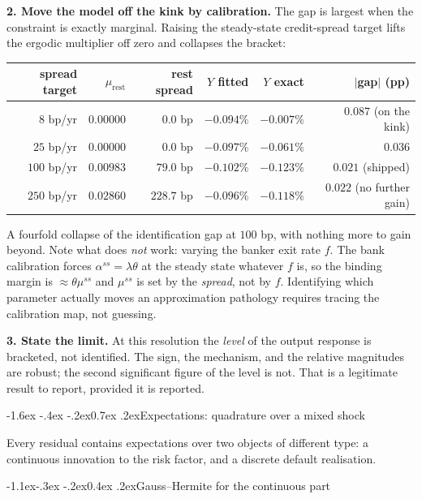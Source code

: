 \documentclass[10pt,a4paper]{article}
\makeatletter
\theoremstyle{definition}
\theoremstyle{plain}
\theoremstyle{remark}
\renewcommand\section{\@startsection{section}{1}{\z@}%
  {-1.6ex \@plus -.4ex \@minus -.2ex}{0.7ex \@plus.2ex}{\normalfont\large\bfseries}}
\renewcommand\subsection{\@startsection{subsection}{2}{\z@}%
  {-1.1ex\@plus -.3ex \@minus -.2ex}{0.4ex \@plus .2ex}{\normalfont\normalsize\bfseries}}
\makeatother
\begin{document}
\textbf{2. Move the model off the kink by calibration.} The gap is largest when the constraint
is exactly marginal. Raising the steady-state credit-spread target lifts the ergodic
multiplier off zero and collapses the bracket:
\begin{center}\small
\begin{tabular}{@{}rrrrrr@{}}
\toprule
spread target & $\mu_{\mathrm{rest}}$ & rest spread & $Y$ fitted & $Y$ exact & $|$gap$|$ (pp) \\
\midrule
$8$ bp/yr   & $0.00000$ & $0.0$ bp & $-0.094\%$ & $-0.007\%$ & $0.087$ \quad(on the kink)\\
$25$ bp/yr  & $0.00000$ & $0.0$ bp & $-0.097\%$ & $-0.061\%$ & $0.036$ \\
$100$ bp/yr & $0.00983$ & $79.0$ bp & $-0.102\%$ & $-0.123\%$ & $\mathbf{0.021}$ \quad(shipped)\\
$250$ bp/yr & $0.02860$ & $228.7$ bp & $-0.096\%$ & $-0.118\%$ & $0.022$ \quad(no further gain)\\
\bottomrule
\end{tabular}
\end{center}
A fourfold collapse of the identification gap at $100$ bp, with nothing more to gain beyond.
Note what does \emph{not} work: varying the banker exit rate $f$. The bank calibration forces
$\alpha^{ss} = \lambda\theta$ at the steady state whatever $f$ is, so the binding margin is
$\approx\theta\mu^{ss}$ and $\mu^{ss}$ is set by the \emph{spread}, not by $f$. Identifying
which parameter actually moves an approximation pathology requires tracing the calibration
map, not guessing.

\textbf{3. State the limit.} At this resolution the \emph{level} of the output response is
bracketed, not identified. The sign, the mechanism, and the relative magnitudes are robust;
the second significant figure of the level is not. That is a legitimate result to report,
provided it is reported.

\section{Expectations: quadrature over a mixed shock}
\label{sec:quad}

Every residual contains expectations over two objects of different type: a continuous
innovation to the risk factor, and a discrete default realisation.

\subsection{Gauss--Hermite for the continuous part}
\end{document}
